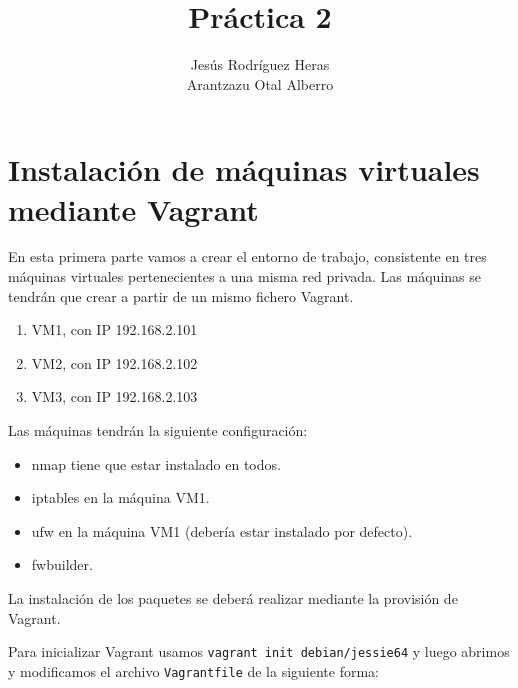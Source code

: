 \documentclass[12pt,letterpaper]{article}
\title{Práctica 2}
\author{Jesús Rodríguez Heras\\
	Arantzazu Otal Alberro}
\begin{document}
	
	\maketitle
%			
	\thispagestyle{empty}
	\newpage
	
	
	
	
	
	\lstset{language=bash, numbers=left, numberstyle=\tiny, numbersep=10pt, firstnumber=1, stepnumber=1, basicstyle=\small\ttfamily, tabsize=1, extendedchars=true, inputencoding=latin1}
	
\section{Instalación de máquinas virtuales mediante Vagrant}
En esta primera parte vamos a crear el entorno de trabajo, consistente en tres máquinas virtuales pertenecientes a una misma red privada. Las máquinas se tendrán que crear a partir de un mismo fichero Vagrant.
\begin{enumerate}
	\item VM1, con IP 192.168.2.101
	\item VM2, con IP 192.168.2.102
	\item VM3, con IP 192.168.2.103
\end{enumerate}

Las máquinas tendrán la siguiente configuración:
\begin{itemize}
	\item nmap tiene que estar instalado en todos.
	\item iptables en la máquina VM1.
	\item ufw en la máquina VM1 (debería estar instalado por defecto).
	\item fwbuilder.
\end{itemize}

La instalación de los paquetes se deberá realizar mediante la provisión de Vagrant.

Para inicializar Vagrant usamos \texttt{vagrant init debian/jessie64} y luego abrimos y modificamos el archivo \texttt{Vagrantfile} de la siguiente forma:

\end{document}
